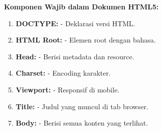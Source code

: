 \begin{konsep}
\textbf{Komponen Wajib dalam Dokumen HTML5:}
\begin{enumerate}[leftmargin=*]
  \item \textbf{DOCTYPE:}  - Deklarasi versi HTML.
  \item \textbf{HTML Root:}  - Elemen root dengan bahasa.
  \item \textbf{Head:}  - Berisi metadata dan resource.
  \item \textbf{Charset:}  - Encoding karakter.
  \item \textbf{Viewport:}  - Responsif di mobile.
  \item \textbf{Title:}  - Judul yang muncul di tab browser.
  \item \textbf{Body:}  - Berisi semua konten yang terlihat.
\end{enumerate}
\end{konsep}

